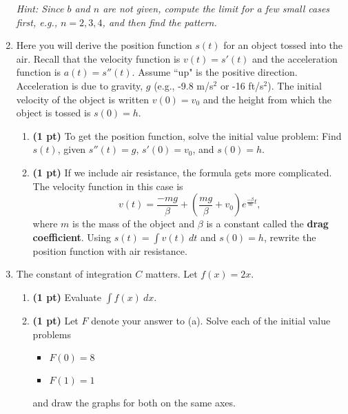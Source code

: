 \documentclass[12pt]{article}
\begin{document}
\begin{enumerate}
\emph{Hint: Since $b$ and $n$ are not given, compute the limit for a few small cases first, e.g., $n=2,3,4$, and then find the pattern.}

\item Here you will derive the position function $s(t)$ for an object tossed into the air.  Recall that the velocity function is $v(t)=s'(t)$ and the acceleration function is $a(t)=s''(t)$.  Assume ``up" is the positive direction.  Acceleration is due to gravity, $g$ (e.g., -9.8 m/s$^{\text{2}}$ or -16 ft/s$^{\text{2}}$).  The initial velocity of the object is written $v(0)=v_0$ and the height from which the object is tossed is $s(0)=h$.  
\begin{enumerate}
	\item {\bf (1 pt)} To get the position function, solve the initial value problem: Find $s(t)$, given $s''(t)=g$, $s'(0)=v_0$, and $s(0)=h$. 
	\item {\bf (1 pt)} If we include air resistance, the formula gets more complicated.  The velocity function in this case is
	\[
	v(t)=\frac{-mg}{\beta}+\left(\frac{mg}{\beta}+v_0\right)e^{\frac{-\beta}{m}t},
	\]
	where $m$ is the mass of the object and $\beta$ is a constant called the {\bf drag coefficient}.  Using $s(t)=\int v(t)\ dt$ and $s(0)=h$, rewrite the position function with air resistance.
\end{enumerate}

\item The constant of integration $C$ matters.  Let $f(x)=2x$.
\begin{enumerate}
	\item {\bf (1 pt)} Evaluate $\int f(x)\ dx$.
	\item {\bf (1 pt)} Let $F$ denote your answer to (a).  Solve each of the initial value problems
		\begin{itemize}
		\item $F(0)=8$
		\item $F(1)=1$
		\end{itemize}
	and draw the graphs for both on the same axes.	
\end{enumerate}

\end{enumerate}
\end{document}
